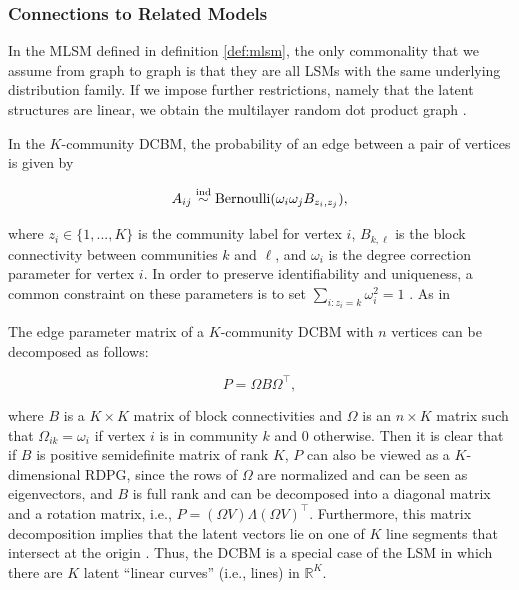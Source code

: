 \documentclass[12pt]{article}
\begin{document}
\hypertarget{connections-to-related-models}{%
\subsubsection{Connections to Related
Models}\label{connections-to-related-models}}

In the MLSM defined in definition \ref{def:mlsm}, the only commonality
that we assume from graph to graph is that they are all LSMs with the
same underlying distribution family. If we impose further restrictions,
namely that the latent structures are linear, we obtain the multilayer
random dot product graph \citep{jones2021multilayer}.

\begin{example}
In the $K$-community DCBM, the probability of an edge between a pair of vertices is given by

$$A_{ij} \stackrel{\mathrm{ind}}{\sim} \mathrm{Bernoulli}(\omega_i \omega_j B_{z_i, z_j}),$$

where $z_i \in \{1, ..., K\}$ is the community label for vertex $i$, $B_{k, \ell}$ is the block connectivity between communities $k$ and $\ell$, and $\omega_i$ is the degree correction parameter for vertex $i$. 
In order to preserve identifiability and uniqueness, a common constraint on these parameters is to set $\sum_{i : z_i = k} \omega_i^2 = 1$ \citep{Karrer_2011}. 
As in 

The edge parameter matrix of a $K$-community DCBM with $n$ vertices can be decomposed as follows:

$$P = \Omega B \Omega^\top,$$

where $B$ is a $K \times K$ matrix of block connectivities and $\Omega$ is an $n \times K$ matrix such that $\Omega_{ik} = \omega_i$ if vertex $i$ is in community $k$ and $0$ otherwise. 
Then it is clear that if $B$ is positive semidefinite matrix of rank $K$, $P$ can also be viewed as a $K$-dimensional RDPG, since the rows of $\Omega$ are normalized and can be seen as eigenvectors, and $B$ is full rank and can be decomposed into a diagonal matrix and a rotation matrix, i.e., $P = (\Omega V) \Lambda (\Omega V)^\top$. 
Furthermore, this matrix decomposition implies that the latent vectors lie on one of $K$ line segments that intersect at the origin \citep{rubindelanchy2017statistical}. 
Thus, the DCBM is a special case of the LSM in which there are $K$ latent ``linear curves'' (i.e., lines) in $\mathbb{R}^K$. 


\end{example}
\end{document}
